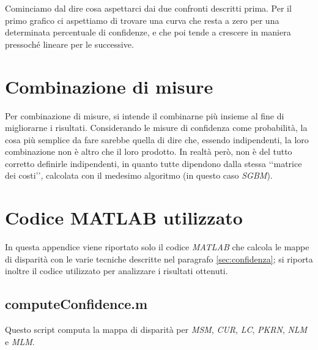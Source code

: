 \documentclass[12pt]{report}
\newcommand{\nullpage}{\newpage\null\thispagestyle{empty}}  %
\begin{document}
			Cominciamo dal dire cosa aspettarci dai due confronti descritti prima. Per il primo grafico ci aspettiamo di trovare una curva che resta a zero per una determinata percentuale di confidenze, e che  poi tende a crescere in maniera pressoché lineare per le successive.  
			


	
	\chapter{Combinazione di misure}
	\label{sec:combinazione}
	\pagestyle{fancy}
				
		Per combinazione di misure, si intende il combinarne più insieme al fine di migliorarne i risultati. Considerando le misure di confidenza come probabilità, la cosa più semplice da fare sarebbe quella di dire che, essendo indipendenti, la loro combinazione non è altro che il loro prodotto. In realtà però, non è del tutto corretto definirle indipendenti, in quanto tutte dipendono dalla stessa ‘‘matrice dei costi’’, calcolata con il medesimo algoritmo (in questo caso \textit{SGBM}). 
		
	
	
	
	\nullpage	
	\appendix 
	
	\chapter{Codice MATLAB utilizzato}
	\label{sec:codice}
	
		In questa appendice viene riportato solo il codice \textit{MATLAB} che calcola le mappe di disparità con le varie tecniche descritte nel paragrafo \ref{sec:confidenza}; si riporta inoltre il codice utilizzato per analizzare i risultati ottenuti.
	
		\section{computeConfidence.m}
		\label{sec:computeConfidence}
		
			Questo script computa la mappa di disparità per \textit{MSM}, \textit{CUR}, \textit{LC}, \textit{PKRN}, \textit{NLM} e \textit{MLM}.
	
			
		
\end{document}
